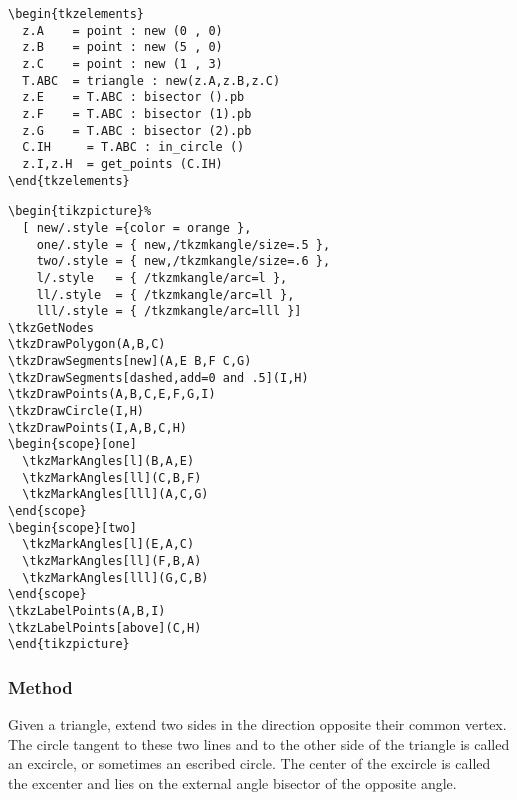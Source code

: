 \begin{minipage}{.5\textwidth}
\begin{Verbatim}
\begin{tkzelements}
  z.A    = point : new (0 , 0)
  z.B    = point : new (5 , 0)
  z.C    = point : new (1 , 3)
  T.ABC  = triangle : new(z.A,z.B,z.C)
  z.E    = T.ABC : bisector ().pb
  z.F    = T.ABC : bisector (1).pb
  z.G    = T.ABC : bisector (2).pb
  C.IH     = T.ABC : in_circle ()
  z.I,z.H  = get_points (C.IH)
\end{tkzelements}
\end{Verbatim}
\end{minipage}
\begin{minipage}{.5\textwidth}
\begin{Verbatim}
\begin{tikzpicture}%
  [ new/.style ={color = orange },
    one/.style = { new,/tkzmkangle/size=.5 },
    two/.style = { new,/tkzmkangle/size=.6 },
    l/.style   = { /tkzmkangle/arc=l },
    ll/.style  = { /tkzmkangle/arc=ll },
    lll/.style = { /tkzmkangle/arc=lll }]
\tkzGetNodes
\tkzDrawPolygon(A,B,C)
\tkzDrawSegments[new](A,E B,F C,G)
\tkzDrawSegments[dashed,add=0 and .5](I,H)
\tkzDrawPoints(A,B,C,E,F,G,I)
\tkzDrawCircle(I,H)
\tkzDrawPoints(I,A,B,C,H)
\begin{scope}[one]
  \tkzMarkAngles[l](B,A,E)
  \tkzMarkAngles[ll](C,B,F)
  \tkzMarkAngles[lll](A,C,G)
\end{scope}
\begin{scope}[two]
  \tkzMarkAngles[l](E,A,C)
  \tkzMarkAngles[ll](F,B,A)
  \tkzMarkAngles[lll](G,C,B)
\end{scope}
\tkzLabelPoints(A,B,I)
\tkzLabelPoints[above](C,H)
\end{tikzpicture}
\end{Verbatim}
\end{minipage}



\subsubsection{Method } %
\label{ssub:method_imeth_triangle_ex__circle}

Given a triangle, extend two sides in the direction opposite their common vertex. The circle tangent to these two lines and to the other side of the triangle is called an excircle, or sometimes an escribed circle. The center  of the excircle is called the excenter and lies on the external angle bisector of the opposite angle.


